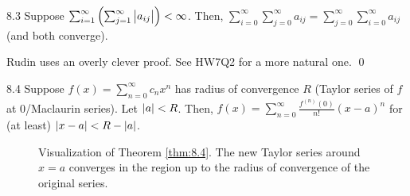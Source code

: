 \begin{theorem}{}{8.3}
    Suppose $\sum_{i=1}^\infty \left(\sum_{j=1}^\infty \abs{a_{ij}}\right) < \infty$. Then, $\sum_{i=0}^\infty \sum_{j=0}^\infty a_{ij} = \sum_{j=0}^\infty \sum_{i=0}^\infty a_{ij}$ (and both converge).
\end{theorem}
\begin{nproof}
    Rudin uses an overly clever proof. See HW7Q2 for a more natural one. \qed
\end{nproof}

\begin{theorem}{}{8.4}
    Suppose $f(x) = \sum_{n=0}^\infty c_nx^n$ has radius of convergence $R$ (Taylor series of $f$ at 0/Maclaurin series). Let $\abs{a} < R$. Then, $f(x) = \sum_{n=0}^\infty \frac{f^{(n)}(0)}{n!}(x-a)^n$ for (at least) $\abs{x - a} < R - \abs{a}$. 
\end{theorem}
\begin{figure}[htbp]
    \centering
    
    \caption{Visualization of Theorem \ref{thm:8.4}. The new Taylor series around $x = a$ converges in the region up to the radius of convergence of the original series.}
    \label{fig51}
\end{figure}

